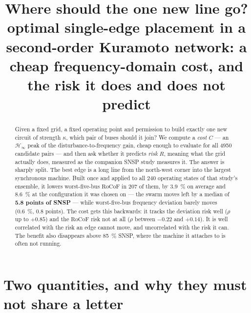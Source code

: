 \documentclass[11pt,a4paper]{article}
\title{\textbf{Where should the one new line go?}\\[2pt]
\large optimal single-edge placement in a second-order Kuramoto network:
a cheap frequency-domain cost, and the risk it does and does not predict}
\author{}
\date{}
\newcommand{\rocof}{\ensuremath{\mathrm{RoCoF}}}
\newcommand{\Hinf}{\ensuremath{\mathcal{H}_\infty}}
\begin{document}
\maketitle
\vspace{-2.2\baselineskip}

\begin{abstract}
\noindent
Given a fixed grid, a fixed operating point and permission to build exactly one
new circuit of strength $\kappa$, which pair of buses should it join? We compute
a \emph{cost} $C$ --- an \Hinf{} peak of the disturbance-to-frequency gain, cheap
enough to evaluate for all 4950 candidate pairs --- and then ask whether it
predicts \emph{risk} $R$, meaning what the grid actually does, measured as the
companion SNSP study measures it. The answer is sharply split. The best edge is
a long line from the north-west corner into the largest synchronous machine.
Built once and applied to all 240 operating states of that study's ensemble, it
lowers worst-five-bus \rocof{} in 207 of them, by \SI{3.9}{\percent} on average
and \SI{8.6}{\percent} at the configuration it was chosen on --- the swarm moves
left by a median of \textbf{5.8 points of SNSP} --- while worst-five-bus
frequency deviation barely moves (\SI{0.6}{\percent}, 0.8 points). The cost gets
this backwards: it tracks the deviation risk well ($\rho$ up to $+0.85$) and the
\rocof{} risk not at all ($\rho$ between $-0.22$ and $+0.14$). It is well
correlated with the risk an edge cannot move, and uncorrelated with the risk it
can. The benefit also disappears above \SI{85}{\percent} SNSP, where the machine
it attaches to is often not running.
\end{abstract}

\section{Two quantities, and why they must not share a letter}
\end{document}
